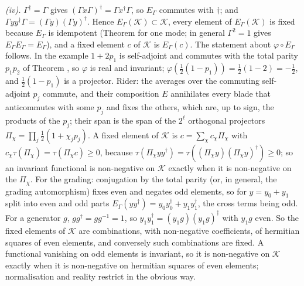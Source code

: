 \emph{(iv).} $\Gamma^{\dagger} = \Gamma$ gives $(\Gamma x\Gamma)^{\dagger} = \Gamma x^{\dagger}\Gamma$, so $E_{\Gamma}$ commutes with $\dagger$; and $\Gamma yy^{\dagger}\Gamma = (\Gamma y)(\Gamma y)^{\dagger}$. Hence $E_{\Gamma}(\mathcal{K}) \subset \mathcal{K}$, every element of $E_{\Gamma}(\mathcal{K})$ is fixed because $E_{\Gamma}$ is idempotent (Theorem  for one mode; in general $\Gamma^{2} = 1$ gives $E_{\Gamma}E_{\Gamma} = E_{\Gamma}$), and a fixed element $c$ of $\mathcal{K}$ is $E_{\Gamma}(c)$. The statement about $\varphi \circ E_{\Gamma}$ follows. In the example $1 + 2p_{1}$ is self-adjoint and commutes with the total parity $p_{1}p_{2}$ of Theorem , so $\varphi$ is real and invariant; $\varphi(\tfrac12(1 - p_{1})) = \tfrac12(1 - 2) = -\tfrac12$, and $\tfrac12(1 - p_{1})$ is a projector. Rider: the averages over the commuting self-adjoint $p_{j}$ commute, and their composition $E$ annihilates every blade that anticommutes with some $p_{j}$ and fixes the others, which are, up to sign, the products of the $p_{j}$; their span is the span of the $2^{\ell}$ orthogonal projectors $\Pi_{\chi} = \prod_{j}\tfrac12(1 + \chi_{j}p_{j})$. A fixed element of $\mathcal{K}$ is $c = \sum_{\chi}c_{\chi}\Pi_{\chi}$ with $c_{\chi}\tau(\Pi_{\chi}) = \tau(\Pi_{\chi}c) \ge 0$, because $\tau(\Pi_{\chi}yy^{\dagger}) = \tau((\Pi_{\chi}y)(\Pi_{\chi}y)^{\dagger}) \ge 0$; so an invariant functional is non-negative on $\mathcal{K}$ exactly when it is non-negative on the $\Pi_{\chi}$. For the grading: conjugation by the total parity (or, in general, the grading automorphism) fixes even and negates odd elements, so for $y = y_{0} + y_{1}$ split into even and odd parts $E_{\Gamma}(yy^{\dagger}) = y_{0}y_{0}^{\dagger} + y_{1}y_{1}^{\dagger}$, the cross terms being odd. For a generator $g$, $gg^{\dagger} = gg^{-1} = 1$, so $y_{1}y_{1}^{\dagger} = (y_{1}g)(y_{1}g)^{\dagger}$ with $y_{1}g$ even. So the fixed elements of $\mathcal{K}$ are combinations, with non-negative coefficients, of hermitian squares of even elements, and conversely such combinations are fixed. A functional vanishing on odd elements is invariant, so it is non-negative on $\mathcal{K}$ exactly when it is non-negative on hermitian squares of even elements; normalisation and reality restrict in the obvious way.

